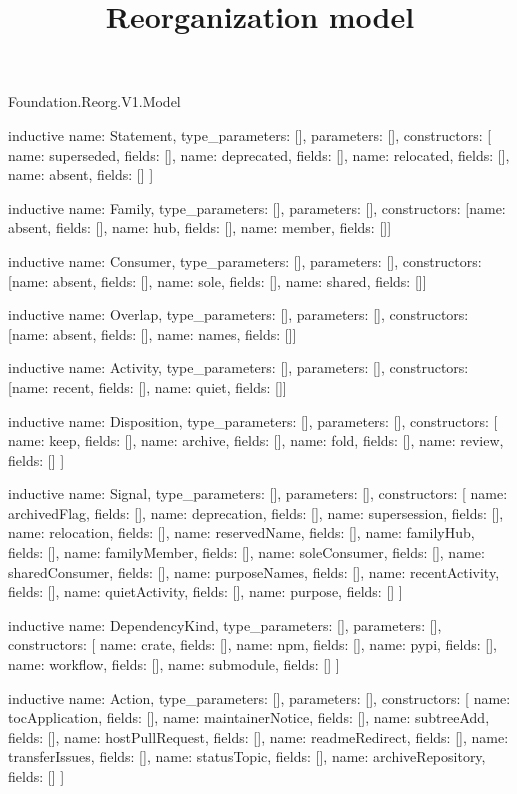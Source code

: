 \begin{lexlean}{Foundation.Reorg.V1.Model}
\title{Reorganization model}
\begin{semanticmodule}
inductive{
  name: Statement,
  type_parameters: [],
  parameters: [],
  constructors: [
    {name: superseded, fields: []},
    {name: deprecated, fields: []},
    {name: relocated, fields: []},
    {name: absent, fields: []}
  ]
}

inductive{
  name: Family,
  type_parameters: [],
  parameters: [],
  constructors: [{name: absent, fields: []}, {name: hub, fields: []}, {name: member, fields: []}]
}

inductive{
  name: Consumer,
  type_parameters: [],
  parameters: [],
  constructors: [{name: absent, fields: []}, {name: sole, fields: []}, {name: shared, fields: []}]
}

inductive{
  name: Overlap,
  type_parameters: [],
  parameters: [],
  constructors: [{name: absent, fields: []}, {name: names, fields: []}]
}

inductive{
  name: Activity,
  type_parameters: [],
  parameters: [],
  constructors: [{name: recent, fields: []}, {name: quiet, fields: []}]
}

inductive{
  name: Disposition,
  type_parameters: [],
  parameters: [],
  constructors: [
    {name: keep, fields: []},
    {name: archive, fields: []},
    {name: fold, fields: []},
    {name: review, fields: []}
  ]
}

inductive{
  name: Signal,
  type_parameters: [],
  parameters: [],
  constructors: [
    {name: archivedFlag, fields: []},
    {name: deprecation, fields: []},
    {name: supersession, fields: []},
    {name: relocation, fields: []},
    {name: reservedName, fields: []},
    {name: familyHub, fields: []},
    {name: familyMember, fields: []},
    {name: soleConsumer, fields: []},
    {name: sharedConsumer, fields: []},
    {name: purposeNames, fields: []},
    {name: recentActivity, fields: []},
    {name: quietActivity, fields: []},
    {name: purpose, fields: []}
  ]
}

inductive{
  name: DependencyKind,
  type_parameters: [],
  parameters: [],
  constructors: [
    {name: crate, fields: []},
    {name: npm, fields: []},
    {name: pypi, fields: []},
    {name: workflow, fields: []},
    {name: submodule, fields: []}
  ]
}

inductive{
  name: Action,
  type_parameters: [],
  parameters: [],
  constructors: [
    {name: tocApplication, fields: []},
    {name: maintainerNotice, fields: []},
    {name: subtreeAdd, fields: []},
    {name: hostPullRequest, fields: []},
    {name: readmeRedirect, fields: []},
    {name: transferIssues, fields: []},
    {name: statusTopic, fields: []},
    {name: archiveRepository, fields: []}
  ]
}


\end{semanticmodule}
\end{lexlean}
